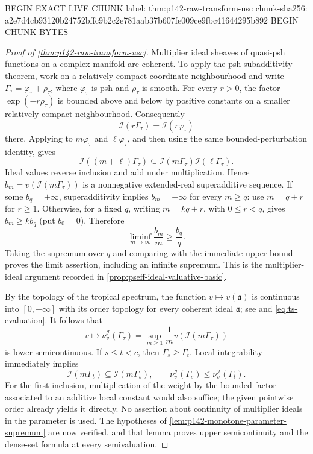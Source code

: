 BEGIN EXACT LIVE CHUNK
label: thm:p142-raw-transform-usc
chunk-sha256: a2e7d4cb93120b24752bffc9b2c2e781aab37b607fe009ce9fbc41644295b892
BEGIN CHUNK BYTES
\begin{proof}[Proof of \cref{thm:p142-raw-transform-usc}]
Multiplier ideal sheaves of quasi-psh functions on a complex manifold
are coherent.  To apply the psh subadditivity theorem, work on a relatively
compact coordinate neighbourhood and write
\(\Gamma_\tau=\varphi_\tau+\rho_\tau\), where
\(\varphi_\tau\) is psh and \(\rho_\tau\) is smooth.  For every
\(r>0\), the factor \(\exp(-r\rho_\tau)\) is bounded above and below
by positive constants on a smaller relatively compact neighbourhood.
Consequently
\[
             \mathcal I(r\Gamma_\tau)
             =\mathcal I(r\varphi_\tau)
\]
there.  Applying \cite[Theorem~2.6(ii)]{DEL00} to
\(m\varphi_\tau\) and \(\ell\varphi_\tau\), and then using the
same bounded-perturbation identity, gives
\[
 \mathcal I((m+\ell)\Gamma_\tau)
 \subseteq\mathcal I(m\Gamma_\tau)
               \mathcal I(\ell\Gamma_\tau).
\]
Ideal values reverse inclusion and add under multiplication. Hence
$b_m=v(\mathcal I(m\Gamma_\tau))$ is a nonnegative extended-real
superadditive sequence. If some $b_q=+\infty$, superadditivity implies
$b_m=+\infty$ for every $m\geq q$: use $m=q+r$ for $r\geq1$.
Otherwise, for a fixed $q$, writing $m=kq+r$, with $0\leq r<q$, gives
$b_m\geq kb_q$ (put $b_0=0$). Therefore
\[
 \liminf_{m\to\infty}\frac{b_m}{m}\geq\frac{b_q}{q}.
\]
Taking the supremum over $q$ and comparing with the immediate upper
bound proves the limit assertion, including an infinite supremum. This
is the multiplier-ideal argument recorded in
\cref{prop:pseff-ideal-valuative-basic}.

By the topology of the tropical spectrum, the function
$v\mapsto v(\mathfrak a)$ is continuous into $[0,+\infty]$ with its
order topology for every coherent ideal $\mathfrak a$; see
\cite[Definition~1.3.1]{MP24} and \eqref{eq:ts-evaluation}.
It follows that
\[
 v\longmapsto\nu_v^{\mathcal I}(\Gamma_\tau)
   =\sup_{m\geq1}\frac1m
          v(\mathcal I(m\Gamma_\tau))
\]
is lower semicontinuous. If $s\leq t<c$, then
$\Gamma_s\geq\Gamma_t$. Local integrability immediately implies
\[
 \mathcal I(m\Gamma_t)\subseteq\mathcal I(m\Gamma_s),
 \qquad
 \nu_v^{\mathcal I}(\Gamma_s)
       \leq\nu_v^{\mathcal I}(\Gamma_t).
\]
For the first inclusion, multiplication of the weight by the bounded
factor associated to an additive local constant would also suffice;
the given pointwise order already yields it directly. No assertion
about continuity of multiplier ideals in the parameter is used.
The hypotheses of \cref{lem:p142-monotone-parameter-supremum} are now
verified, and that lemma proves upper semicontinuity and the dense-set
formula at every semivaluation.


\end{proof}
